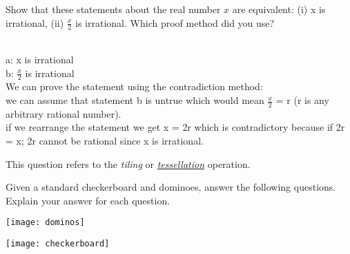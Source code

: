 \documentclass[addpoints]{exam}
\begin{document}
\begin{questions}
\question[5]
  Show that these statements about the real number $x$ are equivalent: (i) x is irrational, (ii)  $\frac{x}{2}$ is irrational. Which proof method did you use?

  \begin{solution}
    \\ a: x is irrational 
    \\ b: $\frac{x}{2}$ is irrational
    \\ We can prove the statement using the contradiction method:
    \\ we can assume that statement b is untrue which would mean $\frac{x}{2}$ = r (r is any arbitrary rational number).
    \\ if we rearrange the statement we get x = 2r which is contradictory because if 2r = x; 2r cannot be rational since x is irrational.
  \end{solution}

\question This question refers to the \textit{tiling} or \href{https://en.wikipedia.org/wiki/Tessellation}{\textit{tessellation}} operation.
  
  \begin{minipage}{0.5 \linewidth}
    Given a standard checkerboard and dominoes, answer the following questions. Explain your answer for each question.
    \begin{center}
      \texttt{[image: dominos]}
    \end{center}
  \end{minipage} 
  \begin{minipage}{0.5 \linewidth}\begin{center}
      \texttt{[image: checkerboard]} \end{center}
  \end{minipage}
\end{questions}
\end{document}
